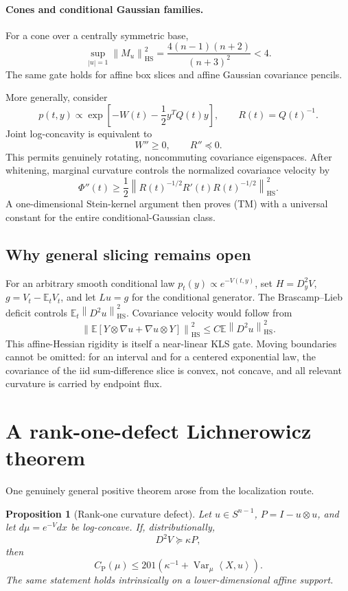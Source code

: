 \documentclass[11pt]{article}
\newtheorem{proposition}[theorem]{Proposition}
\theoremstyle{definition}
\theoremstyle{remark}
\newcommand{\E}{\mathbb E}
\newcommand{\Var}{\operatorname{Var}}
\newcommand{\HS}{\mathrm{HS}}
\newcommand{\1}{\mathbf 1}
\newcommand{\CP}{C_{\mathrm P}}
\newcommand{\ip}[2]{\left\langle #1,#2\right\rangle}
\newcommand{\norm}[1]{\left\lVert #1\right\rVert}
\begin{document}
\paragraph{Cones and conditional Gaussian families.}
For a cone over a centrally symmetric base,
\[
 \sup_{|u|=1}\norm{M_u}_{\HS}^2
 =\frac{4(n-1)(n+2)}{(n+3)^2}<4.                     \tag{4.5}
\]
The same gate holds for affine box slices and affine Gaussian covariance
pencils.

More generally, consider
\[
 p(t,y)\propto
 \exp\!\left[-W(t)-\frac12y^TQ(t)y\right],
 \qquad R(t)=Q(t)^{-1}.
\]
Joint log-concavity is equivalent to
\[
                         W''\ge0,\qquad R''\preceq0.  \tag{4.6}
\]
This permits genuinely rotating, noncommuting covariance eigenspaces.
After whitening, marginal curvature controls the normalized covariance
velocity by
\[
 \Phi''(t)\ge\frac12
 \norm{R(t)^{-1/2}R'(t)R(t)^{-1/2}}_{\HS}^2.          \tag{4.7}
\]
A one-dimensional Stein-kernel argument then proves (TM) with a universal
constant for the entire conditional-Gaussian class.

\subsection{Why general slicing remains open}

For an arbitrary smooth conditional law
\(p_t(y)\propto e^{-V(t,y)}\), set
\(H=D_y^2V\), \(g=V_t-\E_tV_t\), and let \(Lu=g\) for the conditional
generator.  The Brascamp--Lieb deficit controls
\(\E_t\norm{D^2u}_{\HS}^2\).  Covariance velocity would follow from
\[
 \boxed{\quad
 \norm{\E[Y\otimes\nabla u+\nabla u\otimes Y]}_{\HS}^2
 \le C\E\norm{D^2u}_{\HS}^2.
 \quad}                                               \tag{AH}
\]
This affine-Hessian rigidity is itself a near-linear KLS gate.  Moving
boundaries cannot be omitted: for an interval and for a centered
exponential law, the covariance of the iid sum-difference slice is convex,
not concave, and all relevant curvature is carried by endpoint flux.

\section{A rank-one-defect Lichnerowicz theorem}

One genuinely general positive theorem arose from the localization route.

\begin{proposition}[Rank-one curvature defect]
Let \(u\in S^{n-1}\), \(P=I-u\otimes u\), and let
\(d\mu=e^{-V}dx\) be log-concave.  If, distributionally,
\[
                         D^2V\succeq\kappa P,
\]
then
\[
 \boxed{\quad
 \CP(\mu)\le201\left(\kappa^{-1}
 +\Var_\mu\ip{X}{u}\right).
 \quad}                                               \tag{5.1}
\]
The same statement holds intrinsically on a lower-dimensional affine
support.
\end{proposition}
\end{document}
